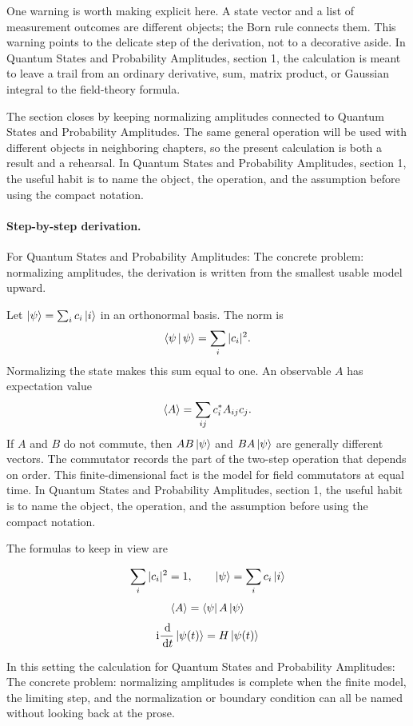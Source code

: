One warning is worth making explicit here.  A state vector and a list of measurement outcomes are different objects; the Born rule connects them.  This warning points to the delicate step of the derivation, not to a decorative aside.  In Quantum States and Probability Amplitudes, section 1, the calculation is meant to leave a trail from an ordinary derivative, sum, matrix product, or Gaussian integral to the field-theory formula.

The section closes by keeping normalizing amplitudes connected to Quantum States and Probability Amplitudes.  The same general operation will be used with different objects in neighboring chapters, so the present calculation is both a result and a rehearsal.  In Quantum States and Probability Amplitudes, section 1, the useful habit is to name the object, the operation, and the assumption before using the compact notation.



\paragraph{Step-by-step derivation.}

For Quantum States and Probability Amplitudes: The concrete problem: normalizing amplitudes, the derivation is written from the smallest usable model upward.

Let \(\left|\psi\right\rangle=\sum_i c_i\left|i\right\rangle\) in an orthonormal basis.  The norm is
\[
  \left\langle \psi\,\middle|\,\psi\right\rangle=\sum_i |c_i|^2.
\]
Normalizing the state makes this sum equal to one.  An observable \(A\) has expectation value
\[
  \left\langle A\right\rangle=\sum_{ij}c_i^*A_{ij}c_j.
\]
If \(A\) and \(B\) do not commute, then \(AB\left|\psi\right\rangle\) and \(BA\left|\psi\right\rangle\) are generally different vectors.  The commutator records the part of the two-step operation that depends on order.  This finite-dimensional fact is the model for field commutators at equal time.  In Quantum States and Probability Amplitudes, section 1, the useful habit is to name the object, the operation, and the assumption before using the compact notation.

The formulas to keep in view are

\[
  \sum_i |c_i|^2=1,\qquad \left|\psi\right\rangle=\sum_i c_i\left|i\right\rangle
\]
\[
  \left\langle A\right\rangle=\left\langle \psi\right|A\left|\psi\right\rangle
\]
\[
  \mathrm i\frac{\,\mathrm d}{\,\mathrm d t}\left|\psi(t)\right\rangle=H\left|\psi(t)\right\rangle
\]

In this setting the calculation for Quantum States and Probability Amplitudes: The concrete problem: normalizing amplitudes is complete when the finite model, the limiting step, and the normalization or boundary condition can all be named without looking back at the prose.




